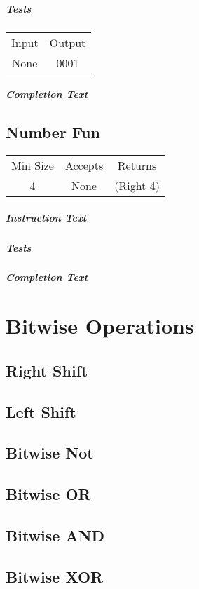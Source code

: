 \documentclass[a4paper, 12pt]{article}
\begin{document}
\subparagraph{Tests}
\begin{tabular}{cc}
	Input & Output \\ 
	None & 0001
\end{tabular}

\subparagraph{Completion Text}
\subsection{Number Fun}
\begin{tabular}{ccc}
	Min Size & Accepts & Returns \\
	4 & None & (Right 4)
\end{tabular}

\subparagraph{Instruction Text}

\subparagraph{Tests}


\subparagraph{Completion Text}
\section{Bitwise Operations}
\subsection{Right Shift}
\subsection{Left Shift}
\subsection{Bitwise Not}
\subsection{Bitwise OR}
\subsection{Bitwise AND}
\subsection{Bitwise XOR}
\end{document}
